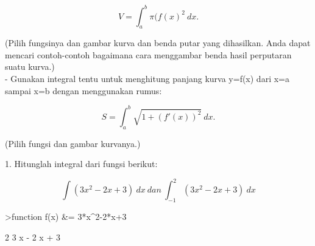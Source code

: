\documentclass{article}
\begin{document}
\begin{eulernotebook}
\begin{eulercomment}
\begin{eulercomment}
\begin{eulercomment}
\end{eulercomment}
\begin{eulerformula}
\[
V = \int_a^b \pi (f(x)^2\ dx.
\]
\end{eulerformula}
\begin{eulercomment}
(Pilih fungsinya dan gambar kurva dan benda putar yang dihasilkan.
Anda dapat mencari contoh-contoh bagaimana cara menggambar benda hasil
perputaran suatu kurva.)\\
- Gunakan integral tentu untuk menghitung panjang kurva y=f(x) dari
x=a sampai x=b dengan menggunakan rumus:

\end{eulercomment}
\begin{eulerformula}
\[
S = \int_a^b \sqrt{1+(f'(x))^2} \ dx.
\]
\end{eulerformula}
\begin{eulercomment}
(Pilih fungsi dan gambar kurvanya.)

\end{eulercomment}
\eulersubheading{}
\begin{eulercomment}
1. Hitunglah integral dari fungsi berikut:\\
\end{eulercomment}
\begin{eulerformula}
\[
\int (3x^2-2x+3)\ dx\ dan\ \int_{-1}^{2} (3x^2-2x+3)\ dx
\]
\end{eulerformula}
\begin{eulerprompt}
>function f(x) &= 3*x^2-2*x+3
\end{eulerprompt}
\begin{euleroutput}
  
                                 2
                              3 x  - 2 x + 3
  

\end{euleroutput}
\end{eulercomment}
\end{eulercomment}
\end{eulernotebook}
\end{document}
